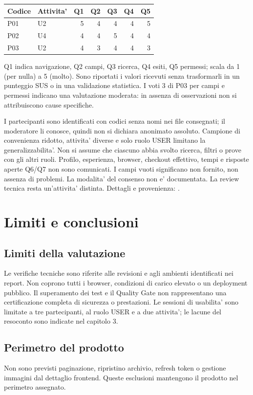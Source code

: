 \documentclass[11pt,a4paper,oneside]{report}
\begin{document}
\begin{center}
\begin{tabular}{llrrrrr}
\toprule Codice & Attivita' & Q1 & Q2 & Q3 & Q4 & Q5\\\midrule
P01 & U2 & 5 & 4 & 4 & 4 & 5\\
P02 & U4 & 4 & 4 & 5 & 4 & 4\\
P03 & U2 & 4 & 3 & 4 & 4 & 3\\
\bottomrule
\end{tabular}
\end{center}
Q1 indica navigazione, Q2 campi, Q3 ricerca, Q4 esiti, Q5 permessi;
scala da 1 (per nulla) a 5 (molto). Sono riportati i valori ricevuti senza
trasformarli in un punteggio SUS o in una validazione statistica.
I voti 3 di P03 per campi e permessi indicano una valutazione moderata:
in assenza di osservazioni non si attribuiscono cause specifiche.

I partecipanti sono identificati con codici senza nomi nei file consegnati;
il moderatore li conosce, quindi non si dichiara anonimato assoluto.
Campione di convenienza ridotto, attivita' diverse e solo ruolo USER limitano
la generalizzabilita'. Non si assume che ciascuno abbia svolto ricerca,
filtri o prove con gli altri ruoli. Profilo, esperienza, browser, checkout
effettivo, tempi e risposte aperte Q6/Q7 non sono comunicati. I campi vuoti
significano non fornito, non assenza di problemi. La modalita' del consenso
non e' documentata. La review tecnica resta un'attivita' distinta.
Dettagli e provenienza: .

\chapter{Limiti e conclusioni}
\section{Limiti della valutazione}
Le verifiche tecniche sono riferite alle revisioni e agli ambienti
identificati nei report. Non coprono tutti i browser, condizioni di carico
elevato o un deployment pubblico. Il superamento dei test e il Quality Gate
non rappresentano una certificazione completa di sicurezza o prestazioni.
Le sessioni di usabilita' sono limitate a tre partecipanti, al ruolo USER
e a due attivita'; le lacune del resoconto sono indicate nel capitolo 3.


\section{Perimetro del prodotto}
Non sono previsti paginazione, ripristino archivio, refresh token o gestione
immagini dal dettaglio frontend.
Queste esclusioni mantengono il prodotto nel perimetro assegnato.
\end{document}
